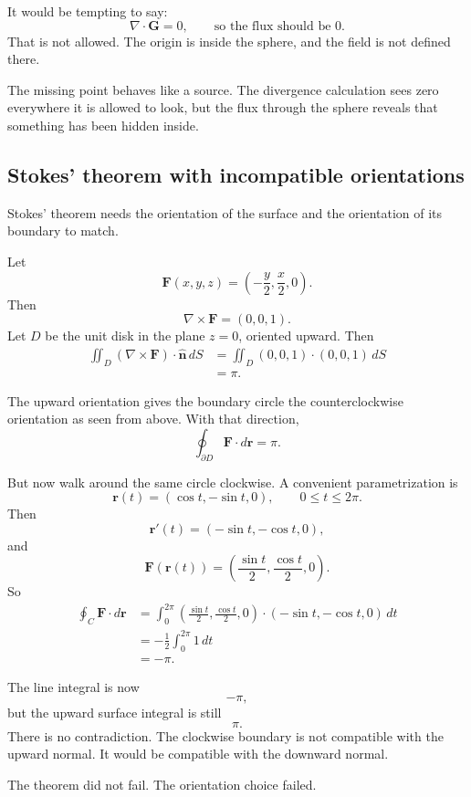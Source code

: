 It would be tempting to say:
\[
    \nabla\cdot\mathbf G=0,
    \qquad
    \text{so the flux should be }0.
\]
That is not allowed.  The origin is inside the sphere, and the field is not defined
there.

The missing point behaves like a source.  The divergence calculation sees zero
everywhere it is allowed to look, but the flux through the sphere reveals that something
has been hidden inside.

\subsection{Stokes' theorem with incompatible orientations}

Stokes' theorem needs the orientation of the surface and the orientation of its boundary
to match.

Let
\[
    \mathbf F(x,y,z)=\left(-\frac y2,\frac x2,0\right).
\]
Then
\[
    \nabla\times\mathbf F=(0,0,1).
\]
Let \(D\) be the unit disk in the plane \(z=0\), oriented upward.  Then
\[
\begin{aligned}
\iint_D(\nabla\times\mathbf F)\cdot\widehat{\mathbf n}\,dS
&=
\iint_D(0,0,1)\cdot(0,0,1)\,dS\\
&=
\pi.
\end{aligned}
\]

The upward orientation gives the boundary circle the counterclockwise orientation as
seen from above.  With that direction,
\[
    \oint_{\partial D}\mathbf F\cdot d\mathbf r=\pi.
\]

But now walk around the same circle clockwise.  A convenient parametrization is
\[
    \mathbf r(t)=(\cos t,-\sin t,0),
    \qquad 0\le t\le2\pi.
\]
Then
\[
    \mathbf r'(t)=(-\sin t,-\cos t,0),
\]
and
\[
    \mathbf F(\mathbf r(t))
    =
    \left(\frac{\sin t}{2},\frac{\cos t}{2},0\right).
\]
So
\[
\begin{aligned}
\oint_C\mathbf F\cdot d\mathbf r
&=
\int_0^{2\pi}
\left(\frac{\sin t}{2},\frac{\cos t}{2},0\right)
\cdot
(-\sin t,-\cos t,0)
\,dt\\
&=
-\frac12\int_0^{2\pi}1\,dt\\
&=
-\pi.
\end{aligned}
\]

The line integral is now
\[
    -\pi,
\]
but the upward surface integral is still
\[
    \pi.
\]
There is no contradiction.  The clockwise boundary is not compatible with the upward
normal.  It would be compatible with the downward normal.

The theorem did not fail.  The orientation choice failed.

